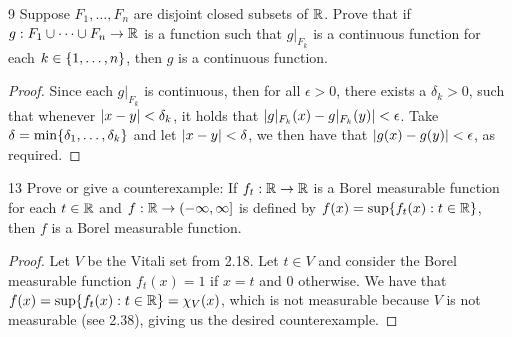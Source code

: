 \begin{exercise}{9}
Suppose $F_1, \dots, F_n$ are disjoint closed subsets of $\mathbb{R}$.
Prove that if $g: F_1 \cup \dots \cup F_n \to \mathbb{R}$ is a function such that $g|_{F_k}$ is a continuous function for each $k \in \{1,\dots, n\}$, then $g$ is a continuous function.
\end{exercise}
\begin{proof}
Since each $g|_{F_k}$ is continuous, then for all $\epsilon > 0$, there exists a $\delta_k > 0$, such that whenever $\left\lvert x-y\right\rvert < \delta_k$, it holds that $\left\lvert g|_{F_k}(x) - g|_{F_k}(y)\right\rvert < \epsilon$.
Take $\delta = \min\{\delta_1,\dots, \delta_k\}$ and let $\left\lvert x - y\right\rvert < \delta$, we then have that $\left\lvert g(x) - g(y)\right\rvert < \epsilon$, as required.
\end{proof} 

\begin{exercise}{13}
Prove or give a counterexample:
If $f_t: \mathbb{R} \to \mathbb{R}$ is a Borel measurable function for each $t \in \mathbb{R}$ and $f: \mathbb{R} \to (-\infty, \infty]$ is defined by $f(x) = \sup\{f_t(x): t\in\mathbb{R}\}$, then $f$ is a Borel measurable function.
\end{exercise}
\begin{proof}
Let $V$ be the Vitali set from 2.18. 
Let $t \in V$ and consider the Borel measurable function $f_t(x) = 1$ if $x=t$ and 0 otherwise.
We have that $f(x) = \sup\{f_t(x): t\in\mathbb{R}\} = \chi_V(x)$, which is not measurable because $V$ is not measurable (see 2.38), giving us the desired counterexample.
\end{proof} 

